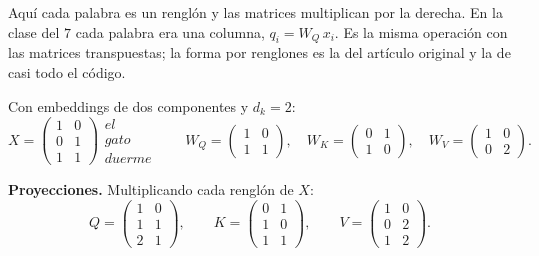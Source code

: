 \documentclass[11pt,letterpaper]{article}
\begin{document}
\begin{observacion}
    Aquí cada palabra es un renglón y las matrices multiplican por la
    derecha. En la clase del $7$ cada palabra era una columna,
    $q_i = W_Q\, x_i$. Es la misma operación con las matrices
    transpuestas; la forma por renglones es la del artículo original y
    la de casi todo el código.
\end{observacion}

\begin{ejemplo}
    Con embeddings de dos componentes y $d_k = 2$:
    \[
        X = \begin{pmatrix} 1 & 0 \\ 0 & 1 \\ 1 & 1 \end{pmatrix}
            \begin{matrix} \textit{el} \\ \textit{gato} \\
                           \textit{duerme} \end{matrix}
        \qquad
        W_Q = \begin{pmatrix} 1 & 0 \\ 1 & 1 \end{pmatrix} , \quad
        W_K = \begin{pmatrix} 0 & 1 \\ 1 & 0 \end{pmatrix} , \quad
        W_V = \begin{pmatrix} 1 & 0 \\ 0 & 2 \end{pmatrix} .
    \]

    \textbf{Proyecciones.} Multiplicando cada renglón de $X$:
    \[
        Q = \begin{pmatrix} 1 & 0 \\ 1 & 1 \\ 2 & 1 \end{pmatrix} ,
        \qquad
        K = \begin{pmatrix} 0 & 1 \\ 1 & 0 \\ 1 & 1 \end{pmatrix} ,
        \qquad
        V = \begin{pmatrix} 1 & 0 \\ 0 & 2 \\ 1 & 2 \end{pmatrix} .
    \]


\end{ejemplo}
\end{document}
